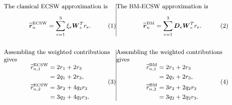 \documentclass[a4paper,12pt]{article}
\newcommand{\vect}[1]{\boldsymbol{#1}}
\newcommand{\matr}[1]{\boldsymbol{#1}}
\begin{document}
\begin{subequations}
 \label{eq:appendix-example-projected-vectors}
 \noindent
 \begin{minipage}[t]{0.48\linewidth}
  \vspace{0pt}\small\raggedright
  The classical ECSW approximation is
  \begin{equation}
   \widetilde{\vect{r}}_n^{\mathrm{ECSW}}
   =\sum_{e=1}^{3}\xi_e\matr{W}_e^T r_e.
  \end{equation}
 \end{minipage}\hfill\vrule width 0.4pt\hfill%
 \begin{minipage}[t]{0.48\linewidth}
  \vspace{0pt}\small\raggedright
  The BM-ECSW approximation is
  \begin{equation}
   \widetilde{\vect{r}}_n^{\mathrm{BM}}
   =\sum_{e=1}^{3}\matr{D}_e\matr{W}_e^T r_e.
  \end{equation}
 \end{minipage}
\end{subequations}

\begin{subequations}
 \label{eq:appendix-example-bm}
 \noindent
 \begin{minipage}[t]{0.48\linewidth}
  \vspace{0pt}\small\raggedright
  Assembling the weighted contributions gives
  \begin{equation}
   \begin{aligned}
    \widetilde r_{n,1}^{\mathrm{ECSW}}
     &=2r_1+2r_3\\
     &=2q_1+2r_3,\\
    \widetilde r_{n,2}^{\mathrm{ECSW}}
     &=3r_2+4q_2r_3\\
     &=3q_2+4q_2r_3.
   \end{aligned}
  \end{equation}
 \end{minipage}\hfill\vrule width 0.4pt\hfill%
 \begin{minipage}[t]{0.48\linewidth}
  \vspace{0pt}\small\raggedright
  Assembling the weighted contributions gives
  \begin{equation}
   \begin{aligned}
    \widetilde r_{n,1}^{\mathrm{BM}}
     &=2r_1+2r_3\\
     &=2q_1+2r_3,\\
    \widetilde r_{n,2}^{\mathrm{BM}}
     &=3r_2+2q_2r_3\\
     &=3q_2+2q_2r_3.
   \end{aligned}
  \end{equation}
 \end{minipage}
\end{subequations}
\end{document}
